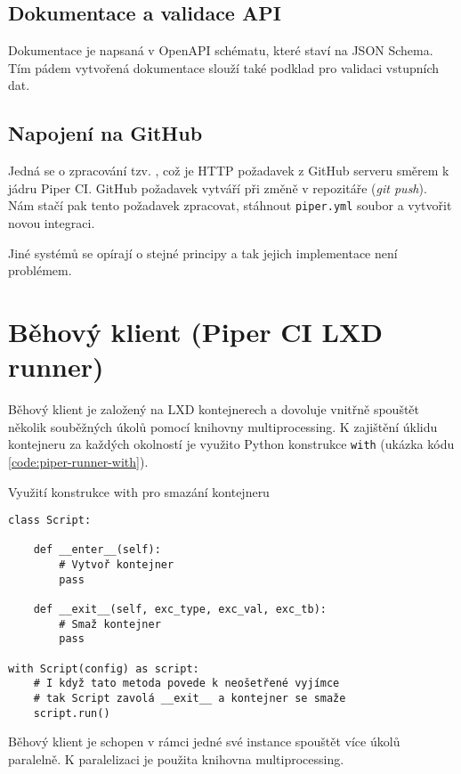 \subsection{Dokumentace a validace API}

Dokumentace je napsaná v OpenAPI schématu, které staví na JSON Schema.
Tím pádem vytvořená dokumentace slouží také podklad pro validaci vstupních dat.

\subsection{Napojení na GitHub}

Jedná se o zpracování tzv. , což je HTTP požadavek z GitHub serveru směrem k jádru Piper CI.
GitHub požadavek vytváří při změně v repozitáře (\textit{git push}).
Nám stačí pak tento požadavek zpracovat, stáhnout \verb|piper.yml| soubor a vytvořit novou integraci.

Jiné systémů se opírají o stejné principy a tak jejich implementace není problémem.

\section{Běhový klient (Piper CI LXD runner)}

Běhový klient je založený na LXD kontejnerech a dovoluje vnitřně spouštět několik souběžných úkolů pomocí knihovny multiprocessing.
K zajištění úklidu kontejneru za každých okolností je využito Python konstrukce \verb|with| (ukázka kódu \ref{code:piper-runner-with}).

\begin{listing}[ht]
\caption{\label{code:piper-runner-with}Využití konstrukce with pro smazání kontejneru}
\begin{verbatim}
class Script:

    def __enter__(self):
        # Vytvoř kontejner
        pass

    def __exit__(self, exc_type, exc_val, exc_tb):
        # Smaž kontejner
        pass

with Script(config) as script:
    # I když tato metoda povede k neošetřené vyjímce
    # tak Script zavolá __exit__ a kontejner se smaže
    script.run()
\end{verbatim}
\end{listing}

Běhový klient je schopen v rámci jedné své instance spouštět více úkolů paralelně.
K paralelizaci je použita knihovna multiprocessing.

